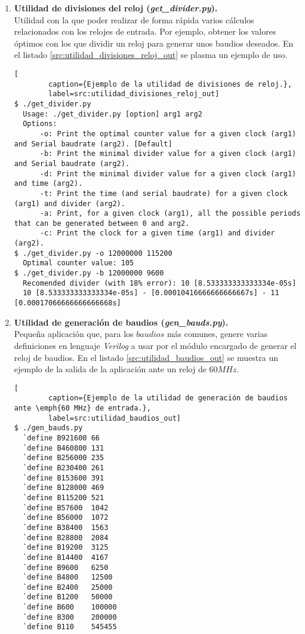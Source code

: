 \begin{enumerate}
    \item \textbf{Utilidad de divisiones del reloj (\emph{get\_divider.py}).} \\
    Utilidad con la que poder realizar de forma rápida varios cálculos relacionados con los relojes de entrada. Por ejemplo, obtener los valores óptimos con los que dividir un reloj para generar unos baudios deseados. En el listado \ref{src:utilidad_divisiones_reloj_out} se plasma un ejemplo de uso.
    \begin{lstlisting}[
        caption={Ejemplo de la utilidad de divisiones de reloj.},
        label=src:utilidad_divisiones_reloj_out]
$ ./get_divider.py
  Usage: ./get_divider.py [option] arg1 arg2
  Options: 
      -o: Print the optimal counter value for a given clock (arg1) and Serial baudrate (arg2). [Default]
      -b: Print the minimal divider value for a given clock (arg1) and Serial baudrate (arg2).
      -d: Print the minimal divider value for a given clock (arg1) and time (arg2).
      -t: Print the time (and serial baudrate) for a given clock (arg1) and divider (arg2).
      -a: Print, for a given clock (arg1), all the possible periods that can be generated between 0 and arg2.
      -c: Print the clock for a given time (arg1) and divider (arg2).
$ ./get_divider.py -o 12000000 115200
  Optimal counter value: 105
$ ./get_divider.py -b 12000000 9600
  Recomended divider (with 18% error): 10 [8.533333333333334e-05s]
  10 [8.533333333333334e-05s] - [0.00010416666666666667s] - 11 [0.00017066666666666668s]          
    \end{lstlisting}
    
    \item \textbf{Utilidad de generación de baudios (\emph{gen\_bauds.py}).} \\
    Pequeña aplicación que, para los $baudios$ más comunes, genere varias definiciones en lenguaje \emph{Verilog} a usar por el módulo encargado de generar el reloj de baudios. En el listado \ref{src:utilidad_baudios_out} se muestra un ejemplo de la salida de la aplicación ante un reloj de $60MHz$.
    \begin{lstlisting}[
        caption={Ejemplo de la utilidad de generación de baudios ante \emph{60 MHz} de entrada.},
        label=src:utilidad_baudios_out]
$ ./gen_bauds.py
  `define B921600 66
  `define B460800 131
  `define B256000 235
  `define B230400 261
  `define B153600 391
  `define B128000 469
  `define B115200 521
  `define B57600  1042
  `define B56000  1072
  `define B38400  1563
  `define B28800  2084
  `define B19200  3125
  `define B14400  4167
  `define B9600   6250
  `define B4800   12500
  `define B2400   25000
  `define B1200   50000
  `define B600    100000
  `define B300    200000
  `define B110    545455
    \end{lstlisting}
    

\end{enumerate}
